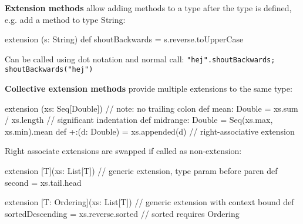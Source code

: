 \documentclass[article, a5paper]{memoir}
\newcommand{\LangColor}{red}
\newcommand{\head}[1]{{\bfseries {\color{\LangColor}{#1}}\par\vspace{1mm}\hrule\vspace{-2mm}}}
\newcommand{\code}{\lstinline[basicstyle=\ttfamily]}
\newcommand{\Newline}{\vspace{\baselineskip}}
\begin{document}
\vspace*{-2.75em}\head{Extension methods}\Newline
{\small
\textbf{Extension methods} allow adding methods to a type after the type is defined, e.g. add a method to type String:
\vspace*{-0.5em}\begin{Code}
extension (s: String) def shoutBackwards = s.reverse.toUpperCase 
\end{Code} 
\vspace*{-0.45em} Can be called using dot notation and normal call: \code|"hej".shoutBackwards; shoutBackwards("hej")|

\vspace*{0.25em}\textbf{Collective extension methods} provide multiple extensions to the same type:
\vspace*{-0.5em}\begin{Code}
extension (xs: Seq[Double])                       // note: no trailing colon
  def mean: Double = xs.sum / xs.length           // significant indentation
  def midrange: Double = Seq(xs.max, xs.min).mean
  def +:(d: Double) = xs.appended(d)          // right-associative extension
\end{Code} 
\vspace*{-0.25em}Right associate extensions are swapped if called as non-extension: 
\vspace*{-0.5em}\begin{Code}
extension [T](xs: List[T])     // generic extension, type param before paren
  def second = xs.tail.head
\end{Code} 
\vspace*{-0.96em}\begin{Code}
extension [T: Ordering](xs: List[T]) // generic extension with context bound
  def sortedDescending = xs.reverse.sorted       // sorted requires Ordering 
\end{Code} 
}
\end{document}
